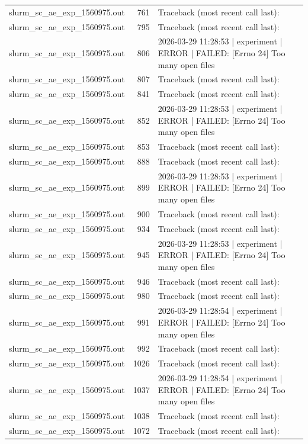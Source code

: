 \begin{tabular}{lrl}
slurm\_sc\_ae\_exp\_1560975.out & 761 & Traceback (most recent call last): \\
slurm\_sc\_ae\_exp\_1560975.out & 795 & Traceback (most recent call last): \\
slurm\_sc\_ae\_exp\_1560975.out & 806 & 2026-03-29 11:28:53 | experiment | ERROR |   FAILED: [Errno 24] Too many open files \\
slurm\_sc\_ae\_exp\_1560975.out & 807 & Traceback (most recent call last): \\
slurm\_sc\_ae\_exp\_1560975.out & 841 & Traceback (most recent call last): \\
slurm\_sc\_ae\_exp\_1560975.out & 852 & 2026-03-29 11:28:53 | experiment | ERROR |   FAILED: [Errno 24] Too many open files \\
slurm\_sc\_ae\_exp\_1560975.out & 853 & Traceback (most recent call last): \\
slurm\_sc\_ae\_exp\_1560975.out & 888 & Traceback (most recent call last): \\
slurm\_sc\_ae\_exp\_1560975.out & 899 & 2026-03-29 11:28:53 | experiment | ERROR |   FAILED: [Errno 24] Too many open files \\
slurm\_sc\_ae\_exp\_1560975.out & 900 & Traceback (most recent call last): \\
slurm\_sc\_ae\_exp\_1560975.out & 934 & Traceback (most recent call last): \\
slurm\_sc\_ae\_exp\_1560975.out & 945 & 2026-03-29 11:28:53 | experiment | ERROR |   FAILED: [Errno 24] Too many open files \\
slurm\_sc\_ae\_exp\_1560975.out & 946 & Traceback (most recent call last): \\
slurm\_sc\_ae\_exp\_1560975.out & 980 & Traceback (most recent call last): \\
slurm\_sc\_ae\_exp\_1560975.out & 991 & 2026-03-29 11:28:54 | experiment | ERROR |   FAILED: [Errno 24] Too many open files \\
slurm\_sc\_ae\_exp\_1560975.out & 992 & Traceback (most recent call last): \\
slurm\_sc\_ae\_exp\_1560975.out & 1026 & Traceback (most recent call last): \\
slurm\_sc\_ae\_exp\_1560975.out & 1037 & 2026-03-29 11:28:54 | experiment | ERROR |   FAILED: [Errno 24] Too many open files \\
slurm\_sc\_ae\_exp\_1560975.out & 1038 & Traceback (most recent call last): \\
slurm\_sc\_ae\_exp\_1560975.out & 1072 & Traceback (most recent call last): \\

\end{tabular}
